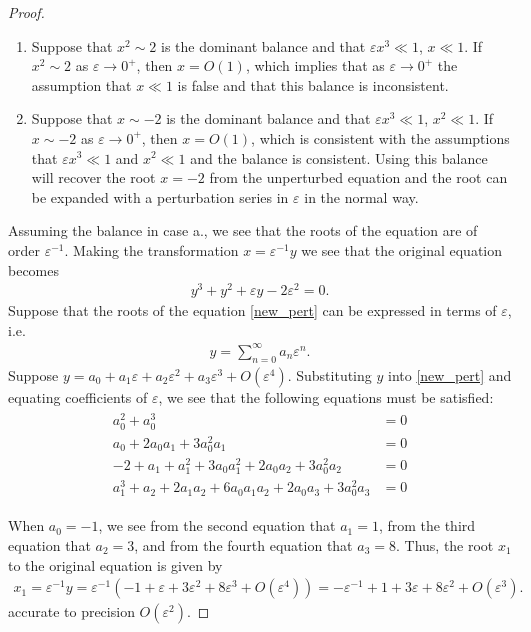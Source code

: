 \documentclass[12pt]{article}
\theoremstyle{definition}
\begin{document}
\begin{proof}
\begin{enumerate}
    \item Suppose that $x^2 \sim 2$ is the dominant balance and that $\varepsilon x^3 \ll 1$, $x \ll 1$.
      If $ x^2 \sim 2$ as $\varepsilon \to 0^+$, then $x = O(1)$, which
      implies that as $\varepsilon \to 0^+$ the assumption that $x \ll 1$ is false and that this balance is inconsistent.

    \item Suppose that $x \sim -2$ is the dominant balance and that $\varepsilon x^3 \ll 1$, $x^2 \ll 1$.
      If $x \sim -2$ as $\varepsilon \to 0^+$, then $x = O(1)$, which is consistent with the assumptions
      that $\varepsilon x^3 \ll 1$ and $x^2 \ll 1$ and the balance is consistent. Using this balance
      will recover the root $x=-2$ from the unperturbed equation and the root can be expanded with a perturbation series in $\varepsilon$ in the normal way.
  \end{enumerate}
  Assuming the balance in case a., we see that the roots of the equation are of order $\varepsilon^{-1}$.
  Making the transformation $x = \varepsilon^{-1}y$ we see that the original equation becomes
  \begin{align}\label{new_pert}
    y^3 + y^2 + \varepsilon y -2 \varepsilon^2 = 0.
  \end{align}
  Suppose that the roots of the equation \eqref{new_pert} can be expressed in terms of $\varepsilon$, i.e.\
  \begin{align*}
    y = \sum_{n=0}^\infty a_n \varepsilon^n.
  \end{align*}
  Suppose $y = a_0 + a_1 \varepsilon + a_2 \varepsilon^2 + a_3 \varepsilon^3 + O(\varepsilon^4)$. Substituting $y$ into \eqref{new_pert} and equating coefficients of $\varepsilon$,
  we see that the following equations must be satisfied:
  \begin{align*}
    \begin{array}{ll}
      a_0^2 + a_0^3 &= 0 \\
      a_0 + 2 a_0 a_1 + 3 a_0^2 a_1 &= 0\\
      -2 + a_1 + a_1^2 + 3 a_0 a_1^2 + 2 a_0 a_2 + 3 a_0^2 a_2&= 0 \\
      a_1^3 + a_2 + 2 a_1 a_2 + 6 a_0 a_1 a_2 + 2 a_0 a_3 + 3 a_0^2 a_3 &= 0
    \end{array}
  \end{align*}

  When $a_0 = -1$, we see from the second equation that $a_1 = 1$, from the third equation that
  $a_2 = 3$, and from the fourth equation that $a_3 = 8$. Thus, the root $x_1$ to the original equation is given by
  \begin{align*}
    x_1 = \varepsilon^{-1}y = \varepsilon^{-1}\left(-1 + \varepsilon + 3 \varepsilon^2 + 8 \varepsilon^3 + O(\varepsilon^4)\right) = -\varepsilon^{-1} + 1 + 3 \varepsilon + 8 \varepsilon^2 + O(\varepsilon^3).
  \end{align*}
  accurate to precision $O(\varepsilon^2)$.


\end{proof}
\end{document}
